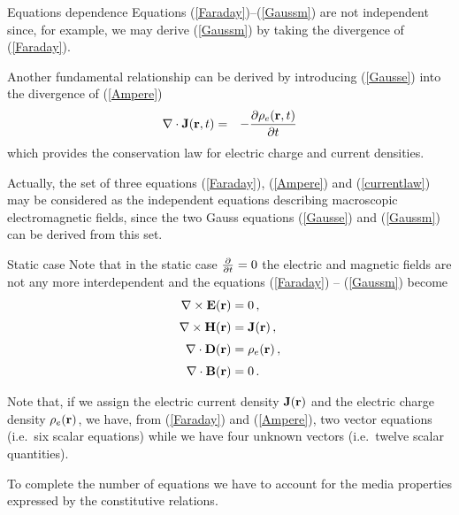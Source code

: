\documentclass[handout,10pt]{beamer}
\begin{document}
\begin{frame}[fragile]{Equations dependence}
\alert{Equations (\ref{Faraday})--(\ref{Gaussm}) are not independent}
since, for example, we may derive (\ref{Gaussm}) by taking the
divergence of (\ref{Faraday}). 

\pause

Another fundamental relationship
can be derived by introducing (\ref{Gausse}) into the divergence
of (\ref{Ampere})
%
\begin{eqnarray}
 \nabla \cdot {\mathbf{J}}({\mathbf{r}},t) & = &
 - {\partial \rho_e ({\mathbf{r}},t) \over\partial t}
\label{currentlaw}
\end{eqnarray}
%
which provides the \alert{conservation law}  for
electric charge and current densities.

\pause
Actually, the set of three equations (\ref{Faraday}), (\ref{Ampere})
and (\ref{currentlaw}) may be considered as the independent
equations describing macroscopic electromagnetic fields, since the
two Gauss equations (\ref{Gausse}) and (\ref{Gaussm}) can be derived
from this set. 

\end{frame}


\begin{frame}[fragile]{Static case}
Note that in the static case ${\partial  \over
\partial t}=0$ the electric and magnetic fields are not any more
interdependent and the equations  (\ref{Faraday}) -- (\ref{Gaussm})
become
%
\begin{subequations}
\begin{align}
\nabla \times {\mathbf{E}}({\mathbf{r}})  & =   0\,,
\\[1mm]
  \nabla \times {\mathbf{H}}({\mathbf{r}} )  & =  {\mathbf{J}}({\mathbf{r}})\,,
\\[1mm]
  \nabla \cdot {\mathbf{D}}({\mathbf{r}})  & =   \rho_e({\mathbf{r}})\,,
\\[1mm]
  \nabla \cdot {\mathbf{B}}({\mathbf{r}})  & =   0\,.
\end{align}
\end{subequations}
%

\pause
Note that, if we assign the electric current density
${\mathbf{J}}({\mathbf{r}})$ and the electric charge density
$\rho_e({\mathbf{r}})$, we have, from (\ref{Faraday}) and
(\ref{Ampere}), two vector equations (i.e.\ six scalar equations)
while we have four unknown vectors (i.e.\ twelve scalar quantities).

\pause
To complete the number of equations we have to account for the media
properties expressed by the \alert{constitutive relations}.


\end{frame}
\end{document}
